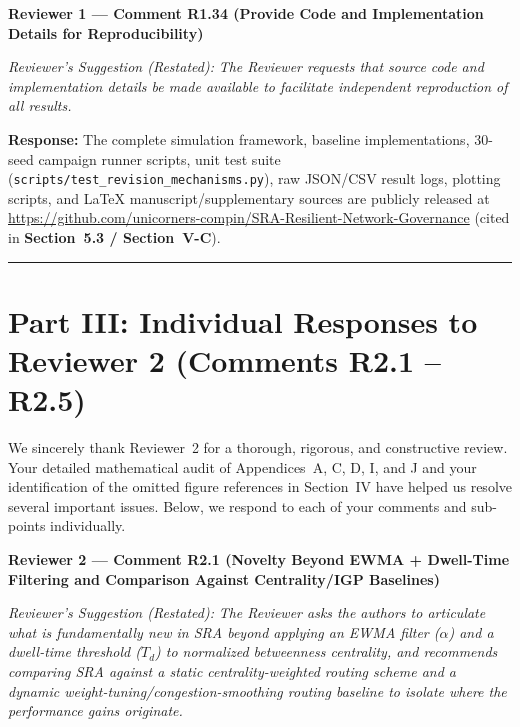 \documentclass[11pt,a4paper]{article}
\newcommand{\cbox}[2]{%
  \vspace{0.6em}\noindent\textbf{#1}\par\smallskip
  \noindent\textit{Reviewer's Suggestion (Restated):} \textit{#2}\par\smallskip
}
\begin{document}
\hrulefill

\cbox{Reviewer 1 --- Comment R1.34 (Provide Code and Implementation Details for Reproducibility)}{The Reviewer requests that source code and implementation details be made available to facilitate independent reproduction of all results.}

\noindent\textbf{Response:} The complete simulation framework, baseline implementations, 30-seed campaign runner scripts, unit test suite (\texttt{scripts/test\_revision\_mechanisms.py}), raw JSON/CSV result logs, plotting scripts, and \LaTeX{} manuscript/supplementary sources are publicly released at \url{https://github.com/unicorners-compin/SRA-Resilient-Network-Governance} (cited in \textbf{Section~5.3 / Section~V-C}).

\vspace{0.5em}
\hrule
\section*{Part III: Individual Responses to Reviewer 2 (Comments R2.1 -- R2.5)}

We sincerely thank Reviewer~2 for a thorough, rigorous, and constructive review. Your detailed mathematical audit of Appendices~A, C, D, I, and J and your identification of the omitted figure references in Section~IV have helped us resolve several important issues. Below, we respond to each of your comments and sub-points individually.

\cbox{Reviewer 2 --- Comment R2.1 (Novelty Beyond EWMA + Dwell-Time Filtering and Comparison Against Centrality/IGP Baselines)}{The Reviewer asks the authors to articulate what is fundamentally new in SRA beyond applying an EWMA filter ($\alpha$) and a dwell-time threshold ($T_d$) to normalized betweenness centrality, and recommends comparing SRA against a static centrality-weighted routing scheme and a dynamic weight-tuning/congestion-smoothing routing baseline to isolate where the performance gains originate.}
\end{document}
